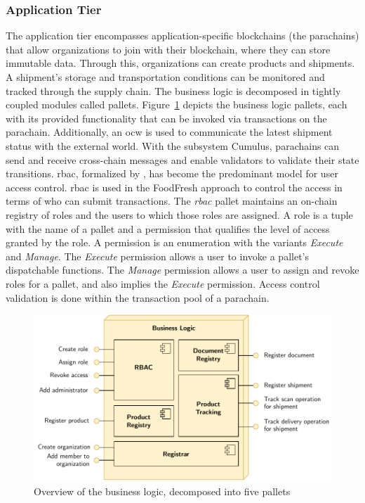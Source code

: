 \documentclass[conference,a4paper,flushend]{neutr}
\begin{document}
\subsubsection{Application Tier} \label{s:application_tier}
The application tier encompasses application-specific blockchains (the parachains) that allow organizations to join with their blockchain, where they can store immutable data. Through this, organizations can create products and shipments. A shipment's storage and transportation conditions can be monitored and tracked through the supply chain. The business logic is decomposed in tightly coupled modules called pallets. Figure~\ref{fig:business_logic} depicts the business logic pallets, each with its provided functionality that can be invoked via transactions on the parachain. Additionally, an \ac{ocw} is used to communicate the latest shipment status with the external world. With the subsystem Cumulus, parachains can send and receive cross-chain messages and enable validators to validate their state transitions.
\ac{rbac}, formalized by \citeauthor{ferraiolo2003role} \cite{ferraiolo2003role}, has become the predominant model for user access control. \ac{rbac} is used in the FoodFresh approach to control the access in terms of who can submit transactions. The \textit{rbac} pallet maintains an on-chain registry of roles and the users to which those roles are assigned. A role is a tuple with the name of a pallet and a permission that qualifies the level of access granted by the role. A permission is an enumeration with the variants \textit{Execute} and \textit{Manage}. The \textit{Execute} permission allows a user to invoke a pallet’s dispatchable functions. The \textit{Manage} permission allows a user to assign and revoke roles for a pallet, and also implies the \textit{Execute} permission. Access control validation is done within the transaction pool of a parachain.

\begin{figure}[h!t]
\centerline{\includegraphics[scale=0.6]{fig-business_logic}}
\caption{Overview of the business logic, decomposed into five pallets}
\label{fig:business_logic}
\end{figure}
\end{document}
